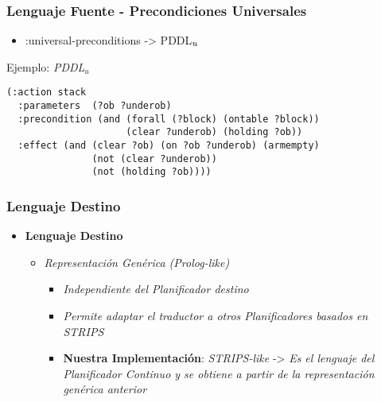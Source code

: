 \documentclass[bigger]{beamer}
\begin{document}
\begin{frame}[fragile,<+->]
\frametitle{Lenguaje Fuente - Precondiciones Universales}
\label{sec-3.6}
\begin{itemize}

\item :universal-preconditions -> PDDL$_{\emph{u}}$\\
\label{sec-3.6.1}%
\end{itemize} %
\begin{block}{Ejemplo: \emph{PDDL$_{u}$}}
\label{sec-3.6.2}

 \begin{verbatim}
(:action stack
  :parameters  (?ob ?underob)
  :precondition (and (forall (?block) (ontable ?block))
                     (clear ?underob) (holding ?ob))
  :effect (and (clear ?ob) (on ?ob ?underob) (armempty)
               (not (clear ?underob)) 
               (not (holding ?ob))))
 \end{verbatim}



    

    




        
\end{block}
\end{frame}
\begin{frame}[<+->]
\frametitle{Lenguaje Destino}
\label{sec-3.7}
\begin{itemize}

\item \textbf{Lenguaje Destino}
\label{sec-3.7.1}%
\begin{itemize}

\item \emph{Representación Genérica (Prolog-like)}
\label{sec-3.7.1.1}%
\begin{itemize}

\item \emph{Independiente del Planificador destino}\\
\label{sec-3.7.1.1.1}%
\item \emph{Permite adaptar el traductor a otros Planificadores basados en STRIPS}\\
\label{sec-3.7.1.1.2}%
\item \textbf{Nuestra Implementación}: \emph{STRIPS-like} -> \emph{Es el lenguaje del Planificador Continuo y se obtiene a partir de la representación genérica anterior}\\
\label{sec-3.7.1.1.3}%
\end{itemize} %
\end{itemize} %
\end{itemize} %
\end{frame}
\end{document}
